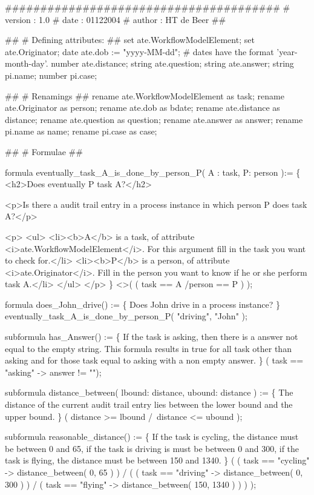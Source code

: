 \begin{ltlcode}
#######################################
# version : 1.0
# date : 01122004
# author : HT de Beer
##

## 
# Defining attributes:
##
set ate.WorkflowModelElement;
set ate.Originator;
date ate.dob := "yyyy-MM-dd"; # dates have the format 'year-month-day'.
number ate.distance;
string ate.question;
string ate.answer;
string pi.name;
number pi.case;

##
# Renamings
##
rename ate.WorkflowModelElement as task;
rename ate.Originator as person;
rename ate.dob as bdate;
rename ate.distance as distance;
rename ate.question as question;
rename ate.answer as answer;
rename pi.name as name;
rename pi.case as case;

##
# Formulae
##

formula eventually_task_A_is_done_by_person_P( A : task, P: person ):=
\{
  <h2>Does eventually P task A?</h2>

    <p>Is there a audit trail entry in a process instance in which person P
    does task A?</p>

    <p>
      <ul>
        <li><b>A</b> is a task, of attribute <i>ate.WorkflowModelElement</i>.
        For this argument fill in the task you want to check for.</li>
        <li><b>P</b> is a person, of attribute <i>ate.Originator</i>. Fill in
        the person you want to know if he or she perform task A.</li>
      </ul>
    </p>
\}
  <>( ( task == A /\bs person == P ) );

formula does_John_drive() := 
\{ Does John drive in a process instance? \}
  eventually_task_A_is_done_by_person_P( "driving", "John" );

subformula has_Answer() := \{
 If the task is asking, then there is a answer not equal to the empty string.
 This formula results in true for all task other than asking and for those
 task equal to asking with a non empty answer.
\}
  ( task == "asking" -> answer != "");

subformula distance_between( lbound: distance, ubound: distance ) := \{
 The distance of the current audit trail entry lies between the lower bound
 and the upper bound. \}
  ( distance >= lbound /\ distance <= ubound );

subformula reasonable_distance() := \{
 If the task is cycling, the distance must be between 0 and 65, if the task
 is driving is must be between 0 and 300, if the task is flying, the distance
 must be between 150 and 1340. \}
  (    ( task == "cycling" -> distance_between( 0, 65 )     ) /\bs
    (  ( task == "driving" -> distance_between( 0, 300 )    ) /\bs
       ( task == "flying"  -> distance_between( 150, 1340 ) )
    )
  );


\end{ltlcode}
